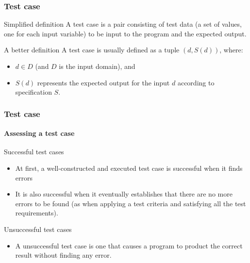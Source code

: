 \begin{frame}[parent={cmap:software-testing-foundations}, hasprev=false, hasnext=true]
\frametitle{Test case}
\label{concept:test-case}
\label{concept:input-domain}
\label{concept:output-domain}
\label{concept:input-data}
\label{concept:output-data}

\begin{block:concept}{Simplified definition}
A test case is a pair consisting of test data (a set of values, one for each
input variable) to be input to the program and the expected output.
\end{block:concept}


\begin{block:concept}{A better definition}
A test case is usually defined as a tuple $(d, S(d))$, where:
\begin{itemize}
	\item $d \in D$ (and $D$ is the input domain), and
	\item $S(d)$ represents the expected output for the input $d$
	according to specification $S$.
\end{itemize}
\end{block:concept}

\hfill
{}
\end{frame}


\begin{frame}[hasprev=false, hasnext=true]
\frametitle{Test case}
\framesubtitle{Assessing a test case}
\label{concept:test-case-success}
\label{concept:test-case-failure}

\begin{block:fact}{Successful test cases}
\begin{itemize}
	\item At first, a well-constructed and executed test case is successful
	when it finds errors~\cite[p. 7]{myers:2004}

	\item It is also successful when it eventually establishes that there are
	no more errors to be found (as when applying a test criteria and satisfying
	all the test requirements).
\end{itemize}
\end{block:fact}

\begin{block:fact}{Unsuccessful test cases}
\begin{itemize}
	\item A unsuccessful test case is one that causes a program to product the
	correct result without finding any error.
\end{itemize}
\end{block:fact}

\hfill
{}
\end{frame}




